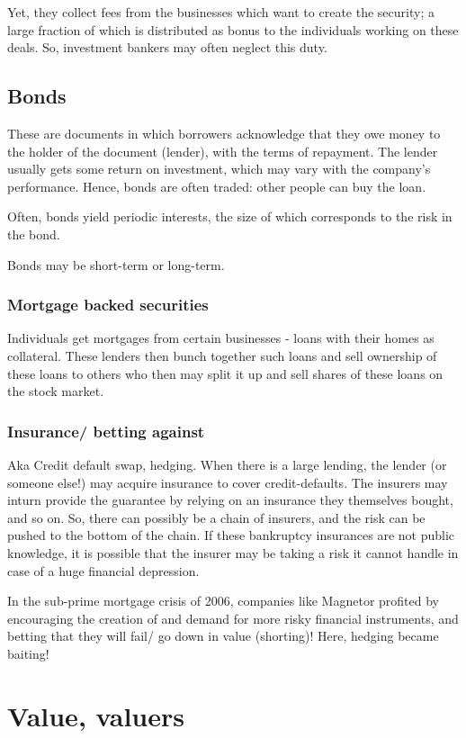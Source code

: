 \documentclass[oneside, article]{memoir}
\begin{document}
Yet, they collect fees from the businesses which want to create the security; a large fraction of which is distributed as bonus to the individuals working on these deals. So, investment bankers may often neglect this duty.

\subsection{Bonds}
These are documents in which borrowers acknowledge that they owe money to the holder of the document (lender), with the terms of repayment. The lender usually gets some return on investment, which may vary with the company's performance. Hence, bonds are often traded: other people can buy the loan.

Often, bonds yield periodic interests, the size of which corresponds to the risk in the bond.

Bonds may be short-term or long-term.

\subsubsection{Mortgage backed securities}
Individuals get mortgages from certain businesses - loans with their homes as collateral. These lenders then bunch together such loans and sell ownership of these loans to others who then may split it up and sell shares of these loans on the stock market.

\subsubsection{Insurance/ betting against}
Aka Credit default swap, hedging. When there is a large lending, the lender (or someone else!) may acquire insurance to cover credit-defaults. The insurers may inturn provide the guarantee by relying on an insurance they themselves bought, and so on. So, there can possibly be a chain of insurers, and the risk can be pushed to the bottom of the chain. If these bankruptcy insurances are not public knowledge, it is possible that the insurer may be taking a risk it cannot handle in case of a huge financial depression.

In the sub-prime mortgage crisis of 2006, companies like Magnetor profited by encouraging the creation of and demand for more risky financial instruments, and betting that they will fail/ go down in value (shorting)! Here, hedging became baiting!


\section{Value, valuers}
\end{document}

